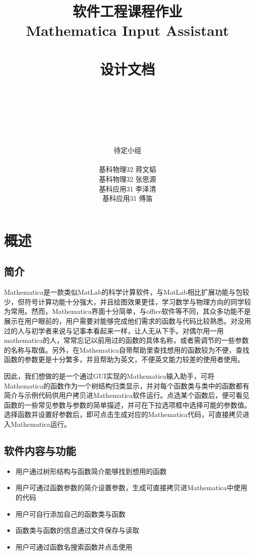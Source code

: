 \documentclass[hyperref, UTF8
,bookmarksnumbered=true, oneside]{ctexbook}
\title{\huge{软件工程课程作业}\\ \Huge \textbf{Mathematica Input Assistant} \\\phantom{aaa} \\\Huge{设计文档}}
\author{\\ \phantom{aaa} \\\phantom{aaa} \\ \phantom{aaa}\\\\\\\huge{待定小组}\\\\ \Large{基科物理32{  }蒋文韬}\\ \Large{基科物理32{ }张思源{ }}\\ \Large{基科应用31{ }李泽清{ }} \\ \Large{基科应用31 { }傅笛{ }} }
\begin{document}
\Large

\frontmatter
\maketitle

\tableofcontents

\mainmatter

\chapter{概述}

	\section{简介} %

		Mathematica是一款类似MatLab的科学计算软件，与MatLab相比扩展功能与包较少，但符号计算功能十分强大，并且绘图效果更佳，学习数学与物理方向的同学较为常用。然而，Mathematica界面十分简单，与office软件等不同，其众多功能不是展示在用户眼前的，用户需要对能够完成他们需求的函数与代码比较熟悉。对没用过的人与初学者来说与记事本看起来一样，让人无从下手。对偶尔用一用mathematica的人，常常忘记以前用过的函数的具体名称，或者需调节的一些参数的名称与取值。另外，在Mathematica自带帮助里查找想用的函数较为不便，查找函数的参数更是十分繁多，并且帮助为英文，不便英文能力较差的使用者使用。

		因此，我们想做的是一个通过GUI实现的Mathematica输入助手，可将Mathematica的函数作为一个树结构归类显示，并对每个函数类与类中的函数都有简介与示例代码供用户拷贝进Mathematica软件运行。点选某个函数后，便可看见函数的一些常见参数与参数的简单描述，并可在下拉选项框中选择可能的参数值。选择函数并设置好参数后，即可点击生成对应的Mathematica代码，可直接拷贝进入Mathematica运行。
		

	\section{软件内容与功能} %

		\begin{itemize}
			\item 用户通过树形结构与函数简介能够找到想用的函数
			\item 用户可通过函数参数的简介设置参数，生成可直接拷贝进Mathematica中使用的代码
			\item 用户可自行添加自己的函数类与函数
			\item 函数类与函数的信息通过文件保存与读取
			\item 用户可通过函数名搜索函数并点击使用 
		\end{itemize}
		
\end{document}
